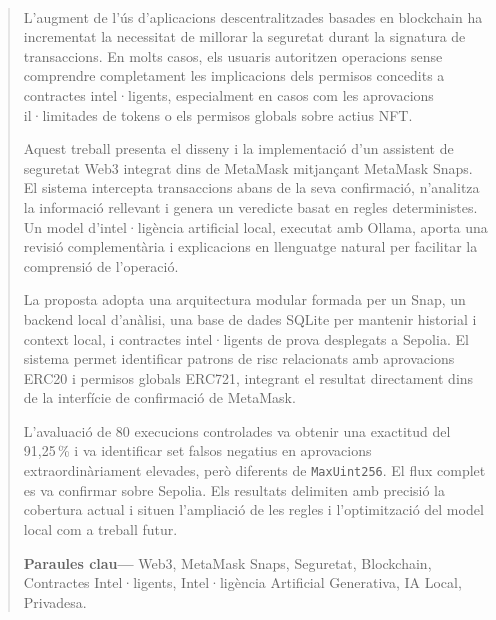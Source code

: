 \newpage

\thispagestyle{plain}
{
    \paragraph{} %
    \begin{abstract}

        L’augment de l’ús d’aplicacions descentralitzades basades en blockchain ha incrementat la necessitat de millorar la seguretat durant la signatura de transaccions. En molts casos, els usuaris autoritzen operacions sense comprendre completament les implicacions dels permisos concedits a contractes intel·ligents, especialment en casos com les aprovacions il·limitades de tokens o els permisos globals sobre actius NFT.

        Aquest treball presenta el disseny i la implementació d’un assistent de seguretat Web3 integrat dins de MetaMask mitjançant MetaMask Snaps. El sistema intercepta transaccions abans de la seva confirmació, n’analitza la informació rellevant i genera un veredicte basat en regles deterministes. Un model d’intel·ligència artificial local, executat amb Ollama, aporta una revisió complementària i explicacions en llenguatge natural per facilitar la comprensió de l’operació.
        
        La proposta adopta una arquitectura modular formada per un Snap, un backend local d’anàlisi, una base de dades SQLite per mantenir historial i context local, i contractes intel·ligents de prova desplegats a Sepolia. El sistema permet identificar patrons de risc relacionats amb aprovacions ERC20 i permisos globals ERC721, integrant el resultat directament dins de la interfície de confirmació de MetaMask.

        L'avaluació de 80 execucions controlades va obtenir una exactitud del 91,25\,\% i va identificar set falsos negatius en aprovacions extraordinàriament elevades, però diferents de \texttt{MaxUint256}. El flux complet es va confirmar sobre Sepolia. Els resultats delimiten amb precisió la cobertura actual i situen l'ampliació de les regles i l'optimització del model local com a treball futur.

        \vspace{30pt}

        \textbf{Paraules clau—} Web3, MetaMask Snaps, Seguretat, Blockchain, Contractes Intel·ligents, Intel·ligència Artificial Generativa, IA Local, Privadesa.

    \end{abstract}
}

